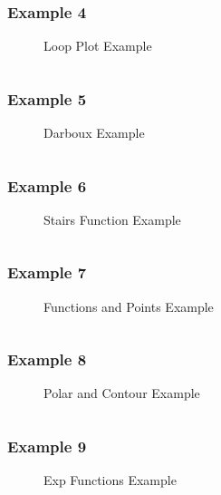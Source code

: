 \subsubsection{Example 4}
\begin{figure}[!htb]
    \centering
    
    \caption{Loop Plot Example}
    \label{fig:4-loop-to-plot-function}
\end{figure}
\inputminted{latex}{./Example/example_4.tex}
\newpage

\subsubsection{Example 5}
\begin{figure}[!htb]
    \centering
    
    \caption{Darboux Example}
    \label{fig:5-darboux-function}
\end{figure}
\inputminted{latex}{./Example/example_5.tex}
\newpage


\subsubsection{Example 6}
\begin{figure}[!htb]
    \centering
    
    \caption{Stairs Function Example}
    \label{fig:6-stairs-function}
\end{figure}
\inputminted{latex}{./Example/example_6.tex}
\newpage


\subsubsection{Example 7}
\begin{figure}[!htb]
    \centering
    
    \caption{Functions and Points Example}
    \label{fig:7-points-function}
\end{figure}
\inputminted{latex}{./Example/example_7.tex}
\newpage


\subsubsection{Example 8}
\begin{figure}[!htb]
    \centering
    
    \caption{Polar and Contour Example}
    \label{fig:polar-contour-plot}
\end{figure}
\inputminted{latex}{./Example/example_8.tex}
\newpage


\subsubsection{Example 9}
\begin{figure}[!htb]
    \centering
    
    \caption{Exp Functions Example}
    \label{fig:9-exp-functions}
\end{figure}
\inputminted{latex}{./Example/example_9.tex}
\newpage



